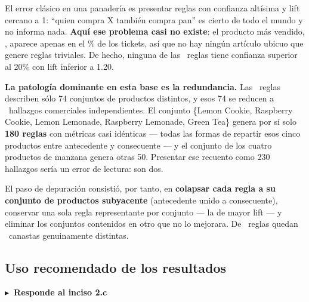 \documentclass[11pt,a4paper]{article}
\newcommand{\inciso}[1]{%
  \vspace{0.2em}\noindent\textcolor{gacento}{\sffamily\bfseries\small
  $\blacktriangleright$~Responde al inciso #1}\vspace{0.3em}\par}
\begin{document}
\begin{alerta}
El error clásico en una panadería es presentar reglas con confianza altísima y
lift cercano a 1: ``quien compra X también compra pan'' es cierto de todo el
mundo y no informa nada. \textbf{Aquí ese problema casi no existe}: el producto
más vendido, \ProdTop, aparece apenas en el \SoporteTop\% de los tickets, así que
no hay ningún artículo ubicuo que genere reglas triviales. De hecho, ninguna de
las \NReglas\ reglas tiene confianza superior al 20\% con lift inferior a 1.20.

\textbf{La patología dominante en esta base es la redundancia.} Las \NReglas\
reglas describen sólo 74 conjuntos de productos distintos, y esos 74 se reducen a
\NCanastas\ hallazgos comerciales independientes. El conjunto \{Lemon Cookie,
Raspberry Cookie, Lemon Lemonade, Raspberry Lemonade, Green Tea\} genera por sí
solo \textbf{180 reglas} con métricas casi idénticas --- todas las formas de
repartir esos cinco productos entre antecedente y consecuente --- y el conjunto de
los cuatro productos de manzana genera otras 50. Presentar ese recuento como 230
hallazgos sería un error de lectura: son dos.
\end{alerta}

\noindent El paso de depuración consistió, por tanto, en \textbf{colapsar cada
regla a su conjunto de productos subyacente} (antecedente unido a consecuente),
conservar una sola regla representante por conjunto --- la de mayor lift --- y
eliminar los conjuntos contenidos en otro que no lo mejorara. De \NReglas\ reglas
quedan \NCanastas\ canastas genuinamente distintas.

\subsection{Uso recomendado de los resultados}
\label{sec:usobakery}
\inciso{2.c}
\end{document}
